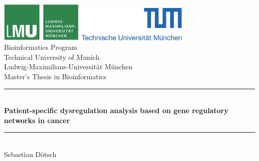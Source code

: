 \documentclass[pdftex,12pt,a4paper]{report}
\newcommand{\HRule}{\rule{\linewidth}{0.5mm}}
\begin{document}
\begin{titlepage}


\sffamily

\begin{center}


\includegraphics[width=0.3\textwidth]{bilder/logo2.jpg}
\hfill
\includegraphics[width=0.4\textwidth]{bilder/logo1.jpg}  
\\[5cm]

{\Large Bioinformatics Program}\\[0.5cm]
{\Large Technical University of Munich}\\[0.5cm]
{\Large Ludwig-Maximilians-Universit\"at M\"unchen}\\[2cm]
{\Large Master's Thesis in Bioinformatics}\\[1.5cm]

\HRule \\[0.4cm]
{ \huge \bfseries Patient-specific dysregulation analysis based on gene regulatory networks in cancer}\\[0.4cm]

\HRule \\[1.5cm]

{\Large Sebastian Dötsch}\\[2.5cm]

\vfill
\end{center}
\end{titlepage}
\pagestyle{empty}
\end{document}
